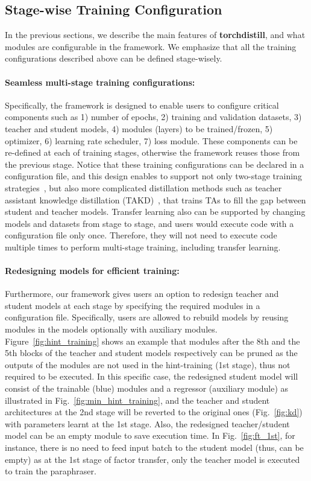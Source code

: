 \documentclass[runningheads]{llncs}
\newcommand{\FRAMEWORK}{{\bf torchdistill}\xspace}
\begin{document}
\subsection{Stage-wise Training Configuration}
In the previous sections, we describe the main features of \FRAMEWORK, and what modules are configurable in the framework.
We emphasize that all the training configurations described above can be defined stage-wisely.

\paragraph{Seamless multi-stage training configurations:}
Specifically, the framework is designed to enable users to configure critical components such as 1) number of epochs, 2) training and validation datasets, 3) teacher and student models, 4) modules (layers) to be trained/frozen, 5) optimizer, 6) learning rate scheduler, 7) loss module.
These components can be re-defined at each of training stages, otherwise the framework reuses those from the previous stage.
Notice that these training configurations can be declared in a configuration file, and this design enables to support not only two-stage training strategies~\cite{romero2015fitnets,yim2017gift,kim2018paraphrasing,heo2019knowledge}, but also more complicated distillation methods such as teacher assistant knowledge distillation (TAKD)~\cite{mirzadeh2019improved}, that trains TAs to fill the gap between student and teacher models.
Transfer learning also can be supported by changing models and datasets from stage to stage, and users would execute code with a configuration file only once.
Therefore, they will not need to execute code multiple times to perform multi-stage training, including transfer learning.

\paragraph{Redesigning models for efficient training:}
Furthermore, our framework gives users an option to redesign teacher and student models at each stage by specifying the required modules in a configuration file.
Specifically, users are allowed to rebuild models by reusing modules in the models optionally with auxiliary modules.
Figure~\ref{fig:hint_training} shows an example that modules after the 8th and the 5th blocks of the teacher and student models respectively can be pruned as the outputs of the modules are not used in the hint-training (1st stage), thus not required to be executed.
In this specific case, the redesigned student model will consist of the trainable (blue) modules and a regressor (auxiliary module) as illustrated in Fig.~\ref{fig:min_hint_training}, and the teacher and student architectures at the 2nd stage will be reverted to the original ones (Fig.~\ref{fig:kd}) with parameters learnt at the 1st stage.
Also, the redesigned teacher/student model can be an empty module to save execution time.
In Fig.~\ref{fig:ft_1st}, for instance, there is no need to feed input batch to the student model (thus, can be empty) as at the 1st stage of factor transfer, only the teacher model is executed to train the paraphraser.
\end{document}
